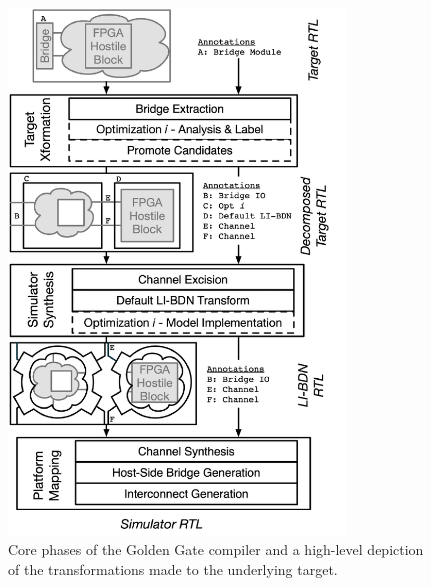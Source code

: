 \begin{figure}
    \centering
    \includegraphics[width=0.8\textwidth]{figures/gg-toolchain.pdf}
    \caption{Core phases of the Golden Gate compiler and a high-level depiction of the transformations made to the underlying target.}
    \label{fig:gg-toolchain}
\end{figure}

